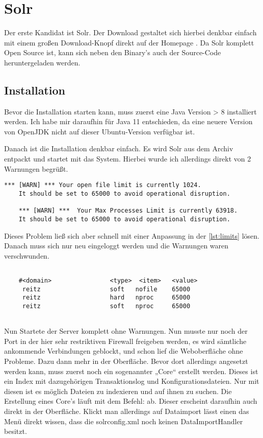 
\section{Solr}

Der erste Kandidat ist Solr. Der Download gestaltet sich hierbei denkbar einfach mit einem großen Download-Knopf direkt auf der Homepage \cite{TheApacheSoftwareFoundation.2019}. Da Solr komplett Open Source ist, kann sich neben den Binary’s auch der Source-Code heruntergeladen werden. 

\subsection{Installation}

Bevor die Installation starten kann, muss zuerst eine Java Version > 8 installiert werden. Ich habe mir daraufhin für Java 11 entschieden, da eine neuere Version von OpenJDK nicht auf dieser Ubuntu-Version verfügbar ist.

Danach ist die Installation denkbar einfach. Es wird Solr aus dem Archiv entpackt und startet mit  das System. Hierbei wurde ich allerdings direkt von 2 Warnungen begrüßt. 

\begin{lstlisting}[frame=single] 
    *** [WARN] *** Your open file limit is currently 1024.
    It should be set to 65000 to avoid operational disruption.

    *** [WARN] ***  Your Max Processes Limit is currently 63918.
    It should be set to 65000 to avoid operational disruption.
\end{lstlisting}

Dieses Problem ließ sich aber schnell mit einer Anpassung in der  \ref{lst:limits} lösen. Danach muss sich nur neu eingeloggt werden und die Warnungen waren verschwunden.

\begin{lstlisting}[frame=single, label={lst:limits}] 

    #<domain>                <type>  <item>   <value>
     reitz                   soft   nofile    65000
     reitz                   hard   nproc     65000
     reitz                   soft   nproc     65000
    
\end{lstlisting}

Nun Startete der Server komplett ohne Warnungen. Nun musste nur noch der Port in der hier sehr restriktiven Firewall freigeben werden, es wird sämtliche ankommende Verbindungen geblockt, und schon lief die Weboberfläche ohne Probleme. Dazu dann mehr in der Oberfläche. Bevor dort allerdings angesetzt werden kann, muss zuerst noch ein sogenannter „Core“ erstellt werden. Dieses ist ein Index mit dazugehörigen Transaktionslog und Konfigurationsdateien. Nur mit diesen ist es möglich Dateien zu indexieren und auf ihnen zu suchen.
Die Erstellung eines Core’s läuft mit dem Befehl:  ab. Dieser erscheint daraufhin auch direkt in der Oberfläche. Klickt man allerdings auf Dataimport lässt einen das Menü direkt wissen, dass die solrconfig.xml noch keinen DataImportHandler besitzt.

